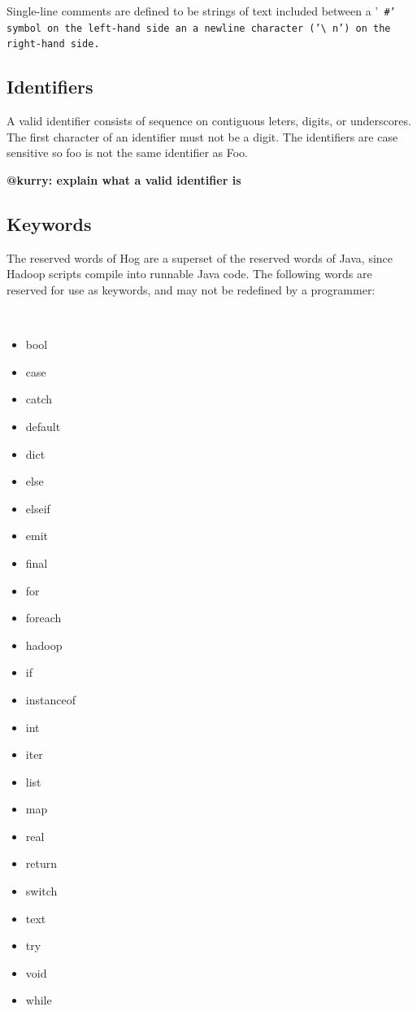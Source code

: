 \documentclass{article}
\begin{document}
Single-line comments are defined to be strings of text included between a '\tt
\#\rm' symbol on the left-hand side an a newline character ('\tt\textbackslash
n\rm') on the right-hand side.


\subsection{Identifiers} %
\label{sub:identifiers}
A valid identifier consists of sequence on contiguous leters, digits, or
underscores. The first character of an identifier must not be a digit.
The identifiers are case sensitive so foo is not the same identifier as Foo. 

\textbf{@kurry: explain what a valid identifier is}


\subsection{Keywords} %
\label{sub:keywords}

The reserved words of Hog are a superset of the reserved words of Java, since
Hadoop scripts compile into runnable Java code. The following words are reserved
for use as keywords, and may not be redefined by a programmer:

\begin{multicols}{4}
\tt
\begin{itemize}
  \item[] bool
  \item[] case
  \item[] catch
  \item[] default
  \item[] dict
  \item[] else
  \item[] elseif
  \item[] emit
  \item[] final
  \item[] for
  \item[] foreach
  \item[] hadoop
  \item[] if
  \item[] instanceof
  \item[] int
  \item[] iter
  \item[] list
  \item[] map
  \item[] real
  \item[] return
  \item[] switch
  \item[] text
  \item[] try
  \item[] void
  \item[] while
\end{itemize}
\rm
\end{multicols}
\end{document}
